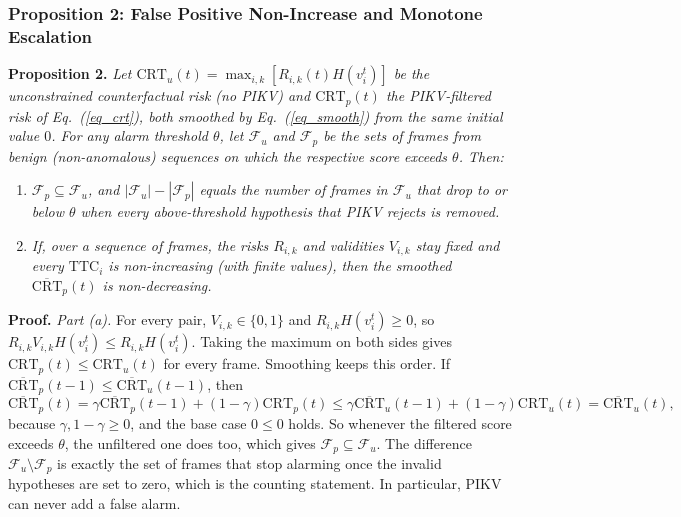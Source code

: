 \documentclass[preprint,12pt]{elsarticle}
\begin{document}
\subsubsection{Proposition 2: False Positive Non-Increase and Monotone Escalation}
\textbf{Proposition 2.} \textit{Let $\text{CRT}_{u}(t) = \max_{i,k} [R_{i,k}(t) H(v_i^t)]$ be the unconstrained counterfactual risk (no PIKV) and $\text{CRT}_{p}(t)$ the PIKV-filtered risk of Eq.~(\ref{eq_crt}), both smoothed by Eq.~(\ref{eq_smooth}) from the same initial value $0$. For any alarm threshold $\theta$, let $\mathcal{F}_u$ and $\mathcal{F}_p$ be the sets of frames from benign (non-anomalous) sequences on which the respective score exceeds $\theta$. Then:}
\begin{enumerate}
    \item[(a)] \textit{$\mathcal{F}_p \subseteq \mathcal{F}_u$, and $|\mathcal{F}_u| - |\mathcal{F}_p|$ equals the number of frames in $\mathcal{F}_u$ that drop to or below $\theta$ when every above-threshold hypothesis that PIKV rejects is removed.}
    \item[(b)] \textit{If, over a sequence of frames, the risks $R_{i,k}$ and validities $V_{i,k}$ stay fixed and every $\text{TTC}_i$ is non-increasing (with finite values), then the smoothed $\overline{\text{CRT}}_p(t)$ is non-decreasing.}
\end{enumerate}

\textbf{Proof.} \textit{Part (a).} For every pair, $V_{i,k} \in \{0,1\}$ and $R_{i,k} H(v_i^t) \ge 0$, so $R_{i,k} V_{i,k} H(v_i^t) \le R_{i,k} H(v_i^t)$. Taking the maximum on both sides gives $\text{CRT}_p(t) \le \text{CRT}_u(t)$ for every frame. Smoothing keeps this order. If $\overline{\text{CRT}}_p(t-1) \le \overline{\text{CRT}}_u(t-1)$, then
\begin{equation*}
\overline{\text{CRT}}_p(t) = \gamma \overline{\text{CRT}}_p(t-1) + (1-\gamma) \text{CRT}_p(t) \le \gamma \overline{\text{CRT}}_u(t-1) + (1-\gamma) \text{CRT}_u(t) = \overline{\text{CRT}}_u(t),
\end{equation*}
because $\gamma, 1 - \gamma \ge 0$, and the base case $0 \le 0$ holds. So whenever the filtered score exceeds $\theta$, the unfiltered one does too, which gives $\mathcal{F}_p \subseteq \mathcal{F}_u$. The difference $\mathcal{F}_u \setminus \mathcal{F}_p$ is exactly the set of frames that stop alarming once the invalid hypotheses are set to zero, which is the counting statement. In particular, PIKV can never add a false alarm.
\end{document}
